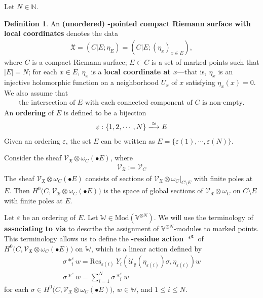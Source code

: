 \documentclass[11pt,b5paper,notitlepage]{article}
\theoremstyle{definition}
\newtheorem{df}{Definition}[section]
\theoremstyle{plain}
\newcommand{\Res}{\mathrm{Res}}
\newcommand{\SV}{\mathscr{V}}
\newcommand{\blt}{\bullet}
\newcommand{\Vbb}{\mathbb V}
\newcommand{\Wbb}{\mathbb W}
\newcommand{\Nbb}{\mathbb N}
\newcommand{\<}{\left\langle}
\renewcommand{\>}{\right\rangle}
\newcommand{\MU}{\mathcal{U}}
\newcommand{\fx}{\mathfrak{X}}
\newcommand{\Mod}{\mathrm{Mod}}
\newcommand{\eps}{\varepsilon}
\numberwithin{equation}{section}
\begin{document}
Let $N\in\Nbb$.

\begin{df}\label{lb34}
An  \textbf{(unordered) -pointed compact Riemann surface with local coordinates} denotes the data
	\begin{align}\label{eq4}
		\fx=(C\big|E;\eta_E)=(C\big| E;(\eta_x)_{x\in E}),
	 \end{align}
	 where $C$ is a compact Riemann surface; $E\subset C$ is a set of marked points such that $|E|=N$; for each $x\in E$, $\eta_x$ is a \textbf{local coordinate at $x$}---that is, $\eta_x$ is an injective holomorphic function on a neighborhood $U_x$ of $x$ satisfying $\eta_x(x)=0$. We also assume that
\begin{align}\label{eq113}
\text{the intersection of $E$ with each connected component of $C$ is non-empty.}
\end{align}
An \textbf{ordering} of $E$ is defined to be a bijection
	 \begin{align}\label{eq5}
		\eps:\{1,2,\cdots,N\}\xlongrightarrow{\simeq} E
	 \end{align}
Given an ordering $\eps$, the set $E$ can be written as $E=\{\eps(1),\cdots,\eps(N)\}$. 
\end{df}


Consider the sheaf $\SV_\fx\otimes \omega_C(\blt E)$, where
\begin{align*}
\SV_\fx:=\SV_C
\end{align*}
The sheaf $\SV_\fx\otimes \omega_C(\blt E)$ consists of sections of $\SV_\fx\otimes \omega_C\big|_{C\setminus E}$ with finite poles at $E$. Then $H^0\big(C,\SV_\fx\otimes \omega_C(\blt E)\big)$ is the space of global sections of $\SV_\fx\otimes \omega_C$ on $C\setminus E$ with finite poles at $E$.




Let $\eps$ be an ordering of $E$. Let $\Wbb\in \Mod(\Vbb^{\otimes N})$. We will use the terminology of \textbf{associating \pmb{$\Wbb$} to  via \pmb{$\eps$}} to describe the assignment of $\Vbb^{\otimes N}$-modules to marked points. This terminology allows us to define the \textbf{\pmb{$\eps$}-residue action $\pmb{*^\eps}$} of $H^0\big(C,\SV_\fx\otimes \omega_C(\blt  E)\big)$ on $\Wbb$, which is a linear action defined by
\begin{subequations}\label{eq6}
	 \begin{gather}
		\sigma*^\eps_i w=\Res_{\eps(i)}~Y_i(\MU_\varrho(\eta_{\eps(i)})\sigma,\eta_{\eps(i)})w\label{eq6a}\\
        \sigma*^\eps w=\sum_{i=1}^N \sigma*^\eps_i w
	 \end{gather}
\end{subequations}
for each $\sigma\in H^0\big(C,\SV_\fx\otimes \omega_C(\blt  E)\big)$, $w\in \Wbb$, and $1\leq i\leq N$. 
\end{document}

